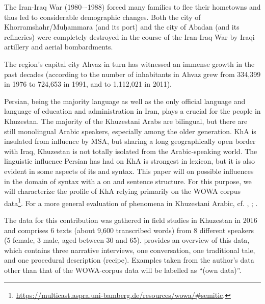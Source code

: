 \documentclass[output=paper,colorlinks,citecolor=brown,draftmode]{langscibook}
\begin{document}
\begin{sloppypar}
The Iran-Iraq War (1980–-1988) forced many families to flee their hometowns and thus led to considerable demographic changes. Both the city of Khorramshahr/Muḥammara (and its port) and the city of Abadan (and its refineries) were completely destroyed in the course of the Iran-Iraq War by Iraqi artillery and aerial bombardments.
\end{sloppypar}

The region's capital city Ahvaz in turn has witnessed an immense growth in the past decades (according to \citealt{nejatian2015} the number of inhabitants in Ahvaz grew from 334,399 in 1976 to 724,653 in 1991, and to 1,112,021 in 2011). 

Persian, being the majority language as well as the only official language and language of education and administration in Iran, plays a crucial  for the people in Khuzestan. The majority of the Khuzestani Arabs are bilingual, but there are still monolingual Arabic speakers, especially among the older generation. KhA is insulated from influence by MSA, but sharing a long geographically open border with Iraq, Khuzestan is not totally isolated from the Arabic-speaking world. The linguistic influence Persian has had on KhA is strongest in lexicon, but it is also evident in some aspects of its  and syntax. This paper will  on possible  influences in the domain of syntax with a  on  and sentence structure. For this purpose, we will characterize the  profile of KhA relying primarily on the WOWA corpus data\footnote{\url{https://multicast.aspra.uni-bamberg.de/resources/wowa/\#semitic}.}. For a more general evaluation of  phenomena in Khuzestani Arabic, cf. \citet{gazsi2011}, \citet{matras2007}; \citet{leitnerContact-induced2020}. 

The data for this contribution was gathered in field studies in Khuzestan in 2016 and comprises 6 texts (about 9,600 transcribed words) from 8 different speakers (5 female, 3 male, aged between 30 and 65).  provides an overview of this data, which contains three narrative interviews, one conversation, one traditional tale, and one procedural description (recipe). Examples taken from the author's data other than that of the WOWA-corpus data will be labelled as ``(own data)''.
\end{document}
